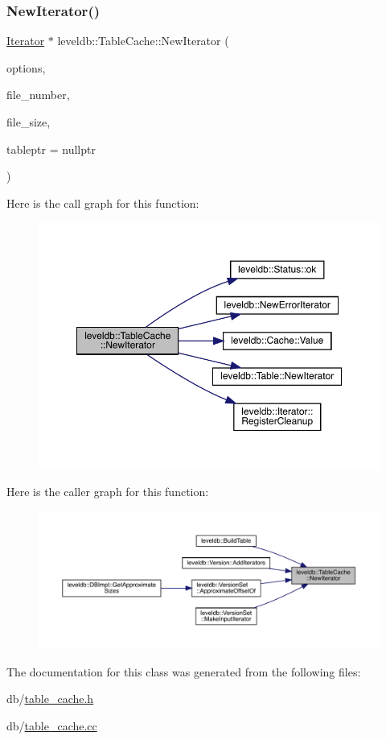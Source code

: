 \subsubsection{\texorpdfstring{NewIterator()}{NewIterator()}}
{\footnotesize\ttfamily \mbox{\hyperlink{classleveldb_1_1_iterator}{Iterator}} $\ast$ leveldb\+::\+Table\+Cache\+::\+New\+Iterator (\begin{DoxyParamCaption}\item[{const \mbox{\hyperlink{structleveldb_1_1_read_options}{Read\+Options}} \&}]{options,  }\item[{uint64\+\_\+t}]{file\+\_\+number,  }\item[{uint64\+\_\+t}]{file\+\_\+size,  }\item[{\mbox{\hyperlink{classleveldb_1_1_table}{Table}} $\ast$$\ast$}]{tableptr = {\ttfamily nullptr} }\end{DoxyParamCaption})}

Here is the call graph for this function\+:
\nopagebreak
\begin{figure}[H]
\begin{center}
\leavevmode
\includegraphics[width=350pt]{classleveldb_1_1_table_cache_ab3312c170081afb56900b50758765151_cgraph}
\end{center}
\end{figure}
Here is the caller graph for this function\+:
\nopagebreak
\begin{figure}[H]
\begin{center}
\leavevmode
\includegraphics[width=350pt]{classleveldb_1_1_table_cache_ab3312c170081afb56900b50758765151_icgraph}
\end{center}
\end{figure}


The documentation for this class was generated from the following files\+:\begin{DoxyCompactItemize}
\item 
db/\mbox{\hyperlink{table__cache_8h}{table\+\_\+cache.\+h}}\item 
db/\mbox{\hyperlink{table__cache_8cc}{table\+\_\+cache.\+cc}}\end{DoxyCompactItemize}
